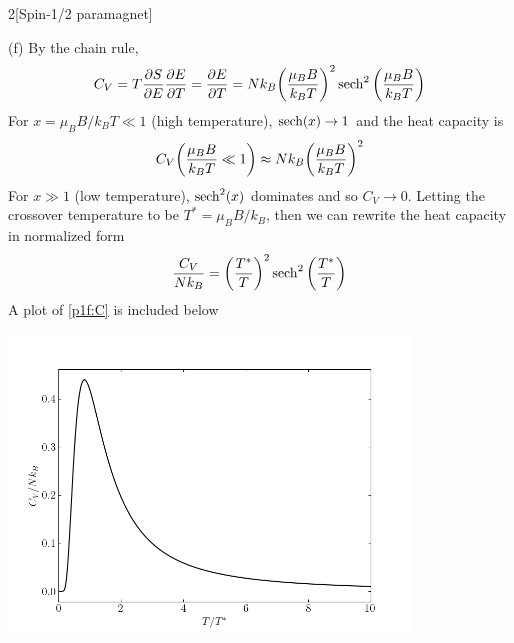 \documentclass[12pt]{article}
\begin{document}
\begin{problem}{2}[Spin-1/2 paramagnet]
\begin{solution}
(f) By the chain rule,
\begin{equation}
    C_V=T\frac{\partial S}{\partial E}\frac{\partial E}{\partial T} 
    =\frac{\partial E}{\partial T}
    =Nk_B\qty(\frac{\mu_BB}{k_BT})^2\sech^2\qty(\frac{\mu_BB}{k_BT})
\end{equation}
For $x=\mu_BB/k_BT\ll1$ (high temperature), $\sech(x)\to1$ and the heat capacity
is
\begin{equation}
    C_V\qty(\frac{\mu_BB}{k_BT}\ll 1)\approx Nk_B\qty(\frac{\mu_BB}{k_BT})^2
\end{equation}
For $x\gg 1$ (low temperature), $\sech^2(x)$ dominates and so $C_V\to0$.
Letting the crossover temperature to be $T^\ast=\mu_BB/k_B$, then we can rewrite
the heat capacity in normalized form
\begin{equation}\label{p1f:C}
    \frac{C_V}{Nk_B}=\qty(\frac{T^\ast}{T})^2\sech^2\qty(\frac{T^\ast}{T}) 
\end{equation}
A plot of \eqref{p1f:C} is included below
\begin{center}
    \includegraphics[width=0.8\textwidth]{p1f.png} 
\end{center}
\end{solution}
\end{problem}
\end{document}
